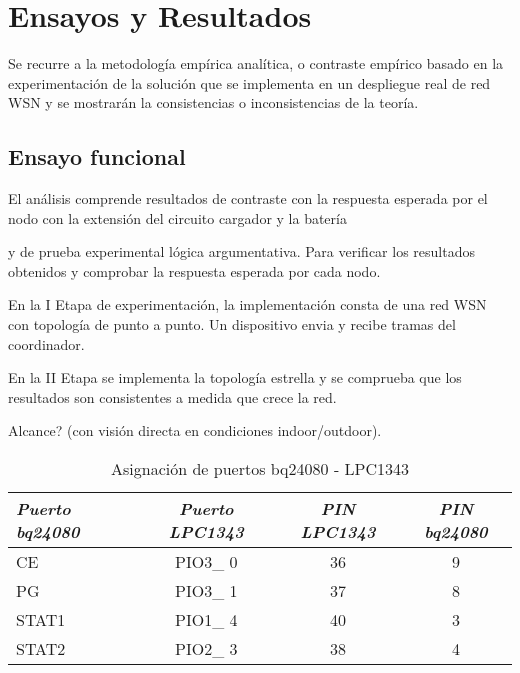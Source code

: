 
\chapter{Ensayos y Resultados} %
\label{Chapter4} 
Se recurre a la metodología empírica analítica, o contraste empírico basado en la experimentación de la solución que se implementa en un despliegue real de red WSN y se mostrarán la consistencias o inconsistencias de la teoría.


\section{Ensayo funcional}
\label{sec:funcional}

El análisis comprende resultados de contraste con la respuesta esperada por el nodo con la extensión del circuito cargador y la batería 

y de prueba experimental lógica argumentativa. Para verificar los resultados obtenidos y comprobar la respuesta esperada por cada nodo.

En la I Etapa de experimentación, la implementación consta de una red WSN con topología de punto a punto. Un dispositivo envia y recibe tramas del coordinador.

En la II Etapa se implementa la topología estrella y se comprueba que los resultados son consistentes a medida que crece la red.

Alcance? (con visión directa en condiciones indoor/outdoor).


\begin{table}[ht]
	\centering
	\caption{Asignación de puertos bq24080 - LPC1343}
	\begin{tabular}{@{} l *3c @{}}    \toprule
		\emph{\textbf{Puerto bq24080}} & \emph{\textbf{Puerto LPC1343}} & \emph{\textbf{PIN LPC1343}} & \emph{\textbf{PIN bq24080}}\\
		\midrule
		CE &  PIO3\_ 0 & 36 & 9	\\	
		PG	&  PIO3\_ 1 & 37 & 8\\
		STAT1 &  PIO1\_ 4 & 40 & 3\\
		STAT2 &  PIO2\_ 3 & 38 & 4\\
		\bottomrule
		\hline
	\end{tabular}
	\label{tab:bq}
\end{table}

